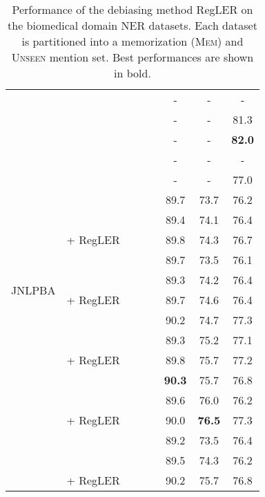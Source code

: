 \documentclass[11pt]{article}
\newcommand{\cmark}{\ding{51}}\newcommand{\xmark}{\ding{55}}\newcommand{\cross}{\ding{61}}\newcommand{\mb}[1]{\textcolor{red}{#1}}
\begin{document}
\begin{table*}[t]
\begin{adjustbox}{width=0.75\textwidth}
\begin{tabular}{ l l c c c c c c }
\midrule
\multirow{21}{*}{JNLPBA}
&  & \xmark & \xmark & \xmark & - & - & - \\
&  & \xmark & \xmark & \xmark & - & - & 81.3  \\
&  & \xmark & \xmark & \xmark & - & - & \textbf{82.0}  \\
&  & \xmark & \xmark & \xmark & - & - & -  \\
&  & \xmark & \xmark & \xmark & - & - & 77.0 \\
\cmidrule{2-8}
&  & \xmark & \xmark & \xmark & 89.7 & 73.7 &  76.2 \\
&  & \xmark & \xmark & \xmark & 89.4 & 74.1 &  76.4 \\
&  + RegLER & \cmark & \cmark & \cmark & 89.8 & 74.3 & 76.7 \\
\cmidrule{2-8}
&  & \xmark & \xmark & \xmark & 89.7 & 73.5 & 76.1 \\
&  & \xmark & \xmark & \xmark & 89.3 & 74.2 & 76.4 \\
&  + RegLER & \cmark & \cmark & \cmark & 89.7 & 74.6 &  76.4 \\
\cmidrule{2-8}
&  & \xmark & \xmark & \xmark & 90.2 & 74.7 & 77.3 \\
&  & \xmark & \xmark & \xmark & 89.3 & 75.2 & 77.1 \\
&  + RegLER & \cmark & \cmark & \cmark & 89.8 & 75.7 & 77.2 \\
\cmidrule{2-8}
&  & \xmark & \xmark & \xmark & \textbf{90.3} & 75.7 & 76.8 \\
&  & \xmark & \xmark & \xmark & 89.6 & 76.0 & 76.2 \\
&  + RegLER & \cmark & \cmark & \cmark & 90.0 & \textbf{76.5} & 77.3 \\
\cmidrule{2-8}
&  & \xmark & \xmark & \xmark & 89.2 & 73.5 & 76.4 \\
&  & \xmark & \xmark & \xmark & 89.5 & 74.3 & 76.2 \\
&  + RegLER & \cmark & \cmark & \cmark & 90.2 & 75.7 & 76.8 \\
\bottomrule
\end{tabular}
\end{adjustbox}
\caption{Performance of the debiasing method RegLER on the biomedical domain NER datasets. Each dataset is partitioned into a memorization (\textsc{Mem}) and \textsc{Unseen} mention set. Best performances are shown in bold.}
\label{tab:maintable 3}
\end{table*}
\end{document}
